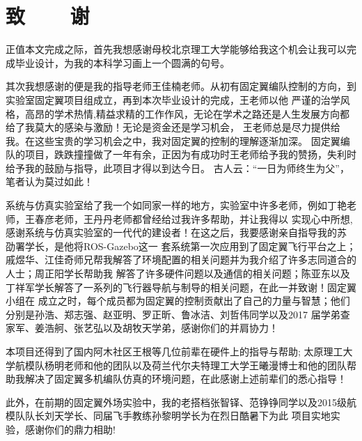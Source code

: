 %
%
%
%
%
%

\chapter*{\vskip 10bp \textmd{致~~~~谢} \vskip -6bp}

正值本文完成之际，首先我想感谢母校北京理工大学能够给我这个机会让我可以完成毕业设计，为我的本科学习画上一个圆满的句号。

其次我想感谢的便是我的指导老师王佳楠老师。从初有固定翼编队控制的方向，到实验室固定翼项目组成立，再到本次毕业设计的完成，王老师以他
严谨的治学风格，高昂的学术热情,精益求精的工作作风，无论在学术之路还是人生发展方向都给了我莫大的感染与激励！无论是资金还是学习机会，
王老师总是尽力提供给我。在这些宝贵的学习机会之中，我对固定翼的控制的理解逐渐加深。
固定翼编队的项目，跌跌撞撞做了一年有余，正因为有成功时王老师给予我的赞扬，失利时给予我的鼓励与指导，此项目才得以到达今日。
古人云：“一日为师终生为父”，笔者认为莫过如此！

系统与仿真实验室给了我一个如同家一样的地方，实验室中许多老师，例如丁艳老师，王春彦老师，王丹丹老师都曾经给过我许多帮助，并让我得以
实现心中所想,感谢系统与仿真实验室的一代代的建设者！在这之后，我要感谢亲自指导我的苏 劭署学长，是他将ROS-Gazebo这一
套系统第一次应用到了固定翼飞行平台之上；戚煜华、江佳奇师兄帮我解答了环境配置的相关问题并为我介绍了许多志同道合的人士；周正阳学长帮助我
解答了许多硬件问题以及通信的相关问题；陈亚东以及丁祥军学长解答了一系列的飞行器导航与制导的相关问题，在此一并致谢！固定翼小组在
成立之时，每个成员都为固定翼的控制贡献出了自己的力量与智慧；他们分别是孙浩、郑志强、赵亚明、罗正昕、鲁冰洁、刘哲伟同学以及2017
届学弟查家军、姜浩舸、张艺弘以及胡牧天学弟，感谢你们的并肩协力！

本项目还得到了国内阿木社区王根等几位前辈在硬件上的指导与帮助; 太原理工大学航模队杨明老师和他的团队以及荷兰代尔夫特理工大学王曦漫博士和他的团队帮
助我解决了固定翼多机编队仿真的环境问题，在此感谢上述前辈们的悉心指导！

此外，在前期的固定翼外场实验中，我的老搭档张智铎、范铮铮同学以及2015级航模队队长刘天学长、同届飞手教练孙黎明学长为在烈日酷暑下为此
项目实地实验，感谢你们的鼎力相助!

